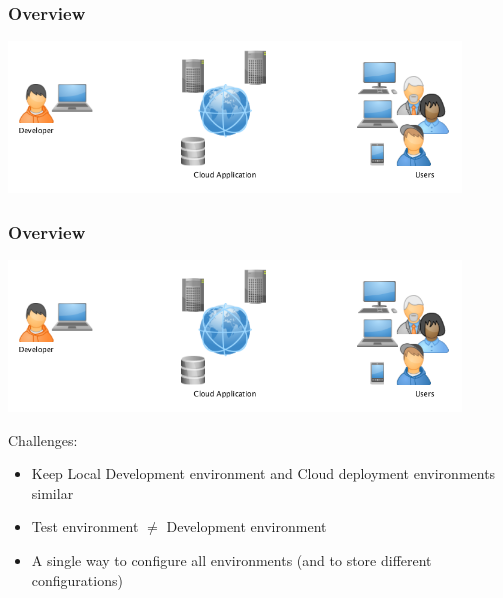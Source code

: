 \documentclass[10pt]{beamer}
\begin{document}
\begin{frame}[t]
\frametitle{Overview}

\includegraphics[width=12cm]{FOverview.png}

\end{frame}

\begin{frame}[t]
\frametitle{Overview}

\includegraphics[width=12cm]{FOverview.png}

Challenges:
\begin{itemize}[<+->]
\item Keep Local Development environment and Cloud deployment environments similar
\item Test environment $\neq$ Development environment
\item A single way to configure all environments (and to store different configurations)
\end{itemize}
\end{frame}
\end{document}
